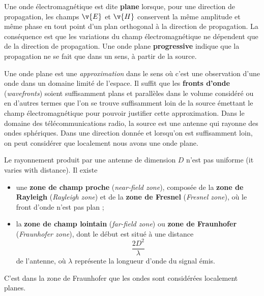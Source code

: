 \begin{definition}
  Une onde électromagnétique est dite \textbf{plane} lorsque, pour une
  direction de propagation, les champs $\v{E}$ et $\v{H}$ conservent la même
  amplitude et même phase en tout point d'un plan orthogonal à la direction de
  propagation. La conséquence est que les variations du champ
  électromagnétique ne dépendent que de la direction de propagation. Une onde
  plane \textbf{progressive} indique que la propagation ne se fait que dans un
  sens, à partir de la source.
\end{definition}

Une onde plane est une \emph{approximation} dans le sens où c'est une
observation d'une onde dans un domaine limité de l'espace. Il suffit que les
\textbf{fronts d'onde} (\textit{wavefronts}) soient suffisamment plans et
parallèles dans le volume considéré ou en d'autres termes que l'on se trouve
suffisamment loin de la source émettant le champ électromagnétique pour pouvoir
justifier cette approximation. Dans le domaine des télécommunications radio, la
source est une antenne qui rayonne des ondes sphériques. Dans une direction
donnée et lorsqu'on est suffisamment loin, on peut considérer que localement
nous avons une onde plane.

\begin{definition}
  Le rayonnement produit par une antenne de dimension $D$ n'est pas uniforme
  (it varies with distance). Il existe
  \begin{itemize}
    \item une \textbf{zone de champ proche} (\textit{near-field zone}),
      composée de la \textbf{zone de Rayleigh} (\textit{Rayleigh zone}) et de
      la \textbf{zone de Fresnel} (\textit{Fresnel zone}), où le front d'onde
      n'est pas plan ;
    \item la \textbf{zone de champ lointain} (\textit{far-field zone}) ou
      \textbf{zone de Fraunhofer} (\textit{Fraunhofer zone}), dont le début est
      situé à une distance
      \[ \frac{2D^2}{\lambda} \]
      de l'antenne, où $\lambda$ représente la longueur d'onde du signal émis.
  \end{itemize}
  C'est dans la zone de Fraunhofer que les ondes sont considérées localement
  planes.
\end{definition}

